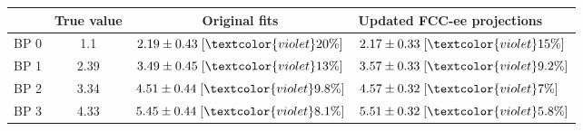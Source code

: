 \begin{tabular}{c||c|c|}
 & True value & Original fits & Updated FCC-ee projections\\
\hline\hline
BP 0 & 1.1 & $2.19\pm0.43\;[\textcolor{violet}{20\%}]$ & $2.17\pm0.33\;[\textcolor{violet}{15\%}]$\\\hline
BP 1 & 2.39 & $3.49\pm0.45\;[\textcolor{violet}{13\%}]$ & $3.57\pm0.33\;[\textcolor{violet}{9.2\%}]$\\\hline
BP 2 & 3.34 & $4.51\pm0.44\;[\textcolor{violet}{9.8\%}]$ & $4.57\pm0.32\;[\textcolor{violet}{7\%}]$\\\hline
BP 3 & 4.33 & $5.45\pm0.44\;[\textcolor{violet}{8.1\%}]$ & $5.51\pm0.32\;[\textcolor{violet}{5.8\%}]$\\
\end{tabular}
